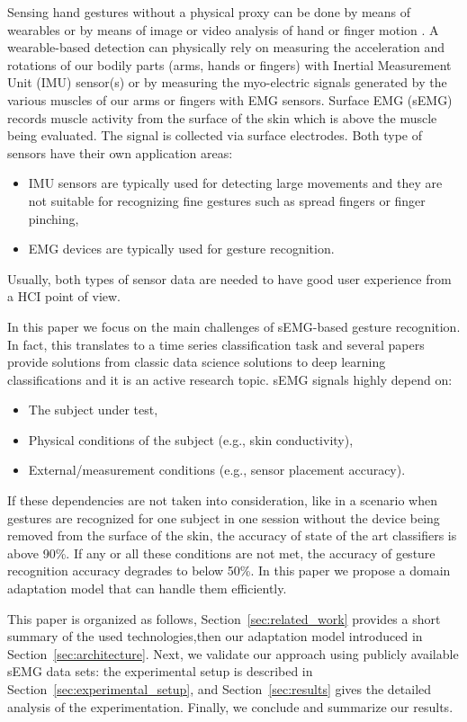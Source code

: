 \documentclass[conference]{IEEEtran}
\begin{document}
Sensing hand gestures without a physical proxy can be done by means of wearables or by means of image or video analysis of hand or finger motion \cite{b1}. A wearable-based detection can physically rely on measuring the acceleration and rotations of our bodily parts (arms, hands or fingers) with Inertial Measurement Unit (IMU) sensor(s) or by measuring the myo-electric signals generated by the various muscles of our arms or fingers with EMG sensors. Surface EMG (sEMG) records muscle activity from the surface of the skin which is above the muscle being evaluated. The signal is collected via surface electrodes. Both type of sensors have their own application areas:
\begin{itemize}
	\item IMU sensors are typically used for detecting large movements and they are not suitable for recognizing fine gestures such as spread fingers or finger pinching,
	\item EMG devices are typically used for gesture recognition.
\end{itemize}
Usually, both types of sensor data are needed to have good user experience from a HCI point of view. 

In this paper we focus on the main challenges of sEMG-based gesture recognition. In fact, this translates to a time series classification task and several papers provide solutions from classic data science solutions \cite{b7} to deep learning classifications \cite{b18} and it is an active research topic. sEMG signals highly depend on:
\begin{itemize}
 \item The subject under test,
 \item Physical conditions of the subject (e.g., skin conductivity),
 \item External/measurement conditions (e.g., sensor placement accuracy).
 \end{itemize} 
 
If these dependencies are not taken into consideration, like in a scenario when gestures are recognized for one subject in one session without the device being removed from the surface of the skin, the accuracy of state of the art classifiers is above 90\%. If any or all these conditions are not met, the accuracy of  gesture recognition accuracy degrades to below 50\%. In this paper we propose a domain adaptation model that can handle them efficiently. 

This paper is organized as follows, Section~\ref{sec:related_work} provides a short summary of the used technologies,then our adaptation model introduced in Section~\ref{sec:architecture}. Next, we validate our approach using publicly available sEMG data sets: the experimental setup is described in Section~\ref{sec:experimental_setup}, and Section~\ref{sec:results} gives the detailed analysis of the experimentation. Finally, we conclude and summarize our results.
\IEEEpubidadjcol
\end{document}
